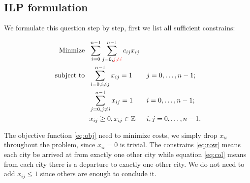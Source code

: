 \documentclass{mcmthesis}
\begin{document}
\subsection{ILP formulation}
We formulate this question step by step, first we list all sufficient constrains:

\begin{align}
\mathop{\mathrm{Minmize \ \  }}       & \sum _{i=0}^{n-1}\sum _{j=0,{\color{Red} j\neq i}}^{n-1}c_{ij}x_{ij} &  & \label{eq:obj}          \\
\mathop{\mathrm{subject \  to \ \  }} & \sum _{i=0,i\neq j}^{n-1}x_{ij}=1                          &  & j=0,\ldots ,n-1;   \label{eq:row}       \\
& \sum _{j=0,j\neq i}^{n-1}x_{ij}=1                          &  & i=0,\ldots ,n-1;         \label{eq:col} \\
& x_{ij} \geq 0, x_{ij} \in \Zbb                                           &  & i,j=0,\ldots ,n-1. \notag
\end{align}

The objective function \eqref{eq:obj} need to minimize costs, we simply drop $x_{ii}$ throughout the problem, since $x_{ii}=0$ is trivial. The constrains \eqref{eq:row} means each city be arrived at from exactly one other city while equation \eqref{eq:col} means from each city there is a departure to exactly one other city. We do not need to add $x_{ij} \le 1 $ since others are enough to conclude it. 
\end{document}
